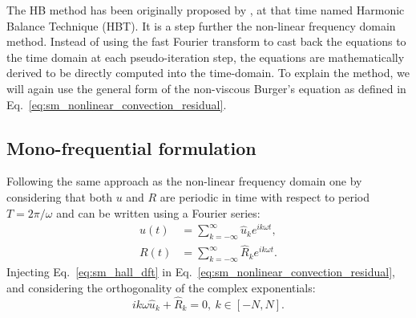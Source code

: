 
The HB method has been originally
proposed by \citet{Hall2002}, at that time named
Harmonic Balance Technique (HBT).
It is a step further the non-linear frequency domain method. Instead
of using the fast Fourier transform to cast back the equations
to the time domain at each pseudo-iteration step, 
the equations are mathematically derived to be directly
computed into the time-domain.
To explain the method, we will again use the general form of 
the non-viscous Burger's equation as defined in
Eq.~\eqref{eq:sm_nonlinear_convection_residual}.


\subsection{Mono-frequential formulation}

Following the same approach as the non-linear frequency domain one by
considering that both $u$ and $R$ are periodic
in time with respect to period $T = 2 \pi / \omega$
and can be written using a Fourier series:
\begin{equation}
	\begin{split}
		u(t) &= \sum_{k=-\infty}^{\infty} \widehat{u}_k e^{i k \omega t}, \\
		R(t) &= \sum_{k=-\infty}^{\infty} \widehat{R}_k e^{i k \omega t}.
		\label{eq:sm_hall_dft}
	\end{split}
\end{equation}
Injecting Eq.~\eqref{eq:sm_hall_dft} in 
Eq.~\eqref{eq:sm_nonlinear_convection_residual}, and considering
the orthogonality of the complex exponentials:
\begin{equation}
	i k \omega \widehat{u}_k + \widehat{R}_k = 0, \: k \in [-N, N].
	\label{eq:sm_hall_frequential_eq}
\end{equation}

